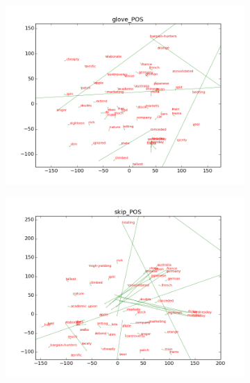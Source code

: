 \begin{figure}[h]
\begin{subfigure}{6cm}
    \includegraphics[scale=0.3]{plots/vectorField/glove_POS.png}
	\label{fig:bestchunking}
	\subcaption{}	
\end{subfigure}
\begin{subfigure}{6cm}
	\centering
    \includegraphics[scale=0.3]{plots/vectorField/skip_POS.png}
	\label{fig:bestchunking}
	\subcaption{}	
\end{subfigure}
\end{figure}

